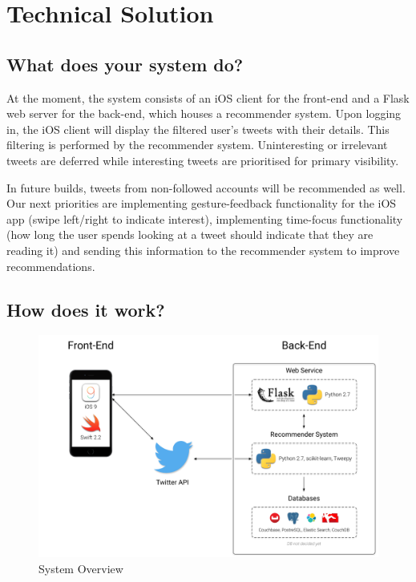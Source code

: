 \documentclass{article}
\begin{document}
\section{Technical Solution}
\subsection{What does your system do?}

At the moment, the system consists of an iOS client for the front-end and a Flask\cite{flask} web server for the back-end, which houses a recommender system. Upon logging in, the iOS client will display the filtered user's tweets with their details. This filtering is performed by the recommender system. Uninteresting or irrelevant tweets are deferred while interesting tweets are prioritised for primary visibility. 

In future builds, tweets from non-followed accounts will be recommended as well. Our next priorities are implementing gesture-feedback functionality for the iOS app (swipe left/right to indicate interest), implementing time-focus functionality (how long the user spends looking at a tweet should indicate that they are reading it) and sending this information to the recommender system to improve recommendations.

\subsection{How does it work?}

\begin{figure}[H]
    \centering
    \includegraphics[width=\textwidth]{system_overview}  
    \caption{System Overview}
\end{figure}
\end{document}
